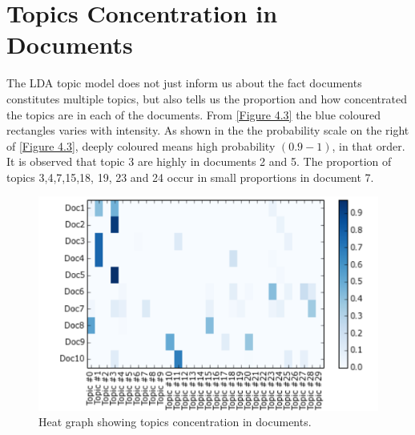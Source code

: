 \section{Topics Concentration in Documents}
The LDA topic model does not just inform us about the fact documents constitutes multiple topics, but also tells us the proportion and how concentrated the topics are in each of the documents. From \eqref{Figure 4.3} the blue coloured rectangles varies with intensity. As shown in the the probability scale on the right of \eqref{Figure 4.3}, deeply coloured means high probability $(0.9-1)$, in that order. It is observed that topic 3 are highly in documents 2 and 5. The proportion of topics 3,4,7,15,18, 19, 23 and 24 occur in small proportions in document 7.
\begin{figure}[hbtp]
\centering
\includegraphics[scale=0.85]{c4_4.png}
\caption{Heat graph showing topics concentration in documents.}\label{Figure 4.3}
\end{figure}
\newpage
